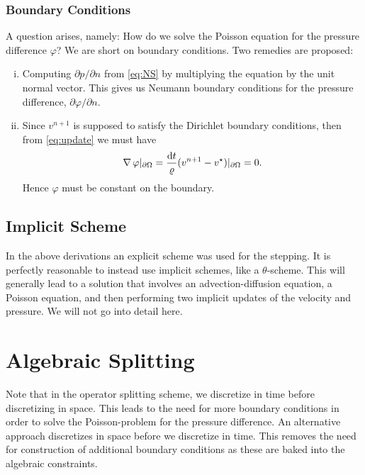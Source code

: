 \subsubsection{Boundary Conditions}
\label{par:boundary_conditions}

A question arises, namely: How do we solve the Poisson equation for the
pressure difference \( \varphi \)? We are short on boundary conditions. Two
remedies are proposed:
\begin{enumerate}[(i)]
    \item Computing \( \partial p / \partial n\) from \cref{eq:NS} by
        multiplying the equation by the unit normal vector. This gives us
        Neumann boundary conditions for the pressure difference, \( \partial
        \varphi / \partial n \).
    \item Since \( v^{n+1} \) is supposed to satisfy the Dirichlet boundary
        conditions, then from \cref{eq:update} we must have
        \begin{equation}
            \operatorname{\mathop{}\!\nabla} \varphi |_{\partial \Omega} = \frac{\mathrm{d} t}{\varrho} (v^{n+1} - v^\star)|_{\partial\Omega} = 0.
        \end{equation}
        Hence \( \varphi \) must be constant on the boundary.
\end{enumerate}

\subsection{Implicit Scheme}
\label{par:implicit_scheme}

In the above derivations an explicit scheme was used for the stepping. It is
perfectly reasonable to instead use implicit schemes, like a \( \theta
\)-scheme. This will generally lead to a solution that involves an
advection-diffusion equation, a Poisson equation, and then performing two
implicit updates of the velocity and pressure. We will not go into detail here.

\section{Algebraic Splitting}
\label{sec:algebraic_splitting}
 
Note that in the operator splitting scheme, we discretize in time before
discretizing in space. This leads to the need for more boundary conditions in
order to solve the Poisson-problem for the pressure difference. An alternative
approach discretizes in space before we discretize in time. This removes the
need for construction of additional boundary conditions as these are baked into
the algebraic constraints.
